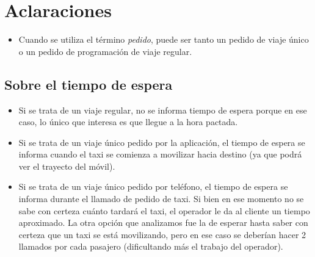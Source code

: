 \documentclass[a4paper]{article}
\begin{document}
\newtheorem{teo}{Teorema}[section]
\newtheorem{propo}{Proposici\'{o}n}[section]
\newtheorem{lema}{Lema}[section]
\newtheorem{coro}{Corolario}[section]
\newtheorem{defi}{Definici\'{o}n}[section]

\newpage
\thispagestyle{empty}
\tableofcontents

\parskip=5pt
\setlength{\parindent}{0pt}

\newpage
\setcounter{page}{1}
\pagestyle{plain}

\newpage


\newcommand{\Asig}{\ensuremath{\leftarrow}}
\newcommand{\AndY}{\ensuremath{\wedge}}
\newcommand{\Or}{\ensuremath{\vee}}
\newcommand{\Not}{\ensuremath{\neg}}
\newcommand{\NotEq}{\ensuremath{\neq}}
\newcommand{\MayorIg}{\ensuremath{\geq}}
\newcommand{\tabu}{\hspace*{0.7cm}}
\newcommand{\ctabu}{\hspace*{0.8cm}}
\newcommand{\htabu}{\hspace*{0.35cm}}
\newcommand{\moduloNombre}[1]{\textbf{#1}}

\section{Aclaraciones}
\begin{itemize}
\item Cuando se utiliza el t\'ermino \textit{pedido}, puede ser tanto un pedido de viaje \'unico o un pedido de programaci\'on
de viaje regular.
\end{itemize}

\subsection{Sobre el tiempo de espera}
\begin{itemize}
\item Si se trata de un viaje regular, no se informa tiempo de espera porque en ese caso, lo \'unico que interesa es que llegue
a la hora pactada.
\item Si se trata de un viaje \'unico pedido por la aplicaci\'on, el tiempo de espera se informa cuando el taxi se comienza a movilizar
hacia destino (ya que podr\'a ver el trayecto del m\'ovil).
\item Si se trata de un viaje \'unico pedido por tel\'efono, el tiempo de espera se informa durante el llamado de pedido de taxi.
Si bien en ese momento no se sabe con certeza cu\'anto tardar\'a el taxi, el operador le da al cliente un tiempo aproximado.
La otra opci\'on que analizamos fue la de esperar hasta saber con certeza que un taxi se est\'a movilizando, pero en ese caso
se deber\'ian hacer 2 llamados por cada pasajero (dificultando m\'as el trabajo del operador).
\end{itemize}
\end{document}
